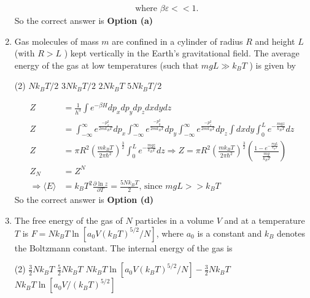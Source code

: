 \begin{enumerate}
\begin{answer}
\begin{align*}
&\text{	where }\beta \varepsilon<<1.
	\end{align*}
		So the correct answer is \textbf{Option (a)}
\end{answer}
\item 	Gas molecules of mass $m$ are confined in a cylinder of radius $R$ and height $L$ (with $R>L$ ) kept vertically in the Earth's gravitational field. The average energy of the gas at low temperatures (such that $m g L \gg k_{B} T$ ) is given by
{	}
	 \begin{tasks}(2)
		\task[\textbf{a.}]$N k_{B} T / 2$
		\task[\textbf{b.}]$3 N k_{B} T / 2$
		\task[\textbf{c.}]$2 N k_{B} T$
		\task[\textbf{d.}] $5 N k_{B} T / 2$
	\end{tasks}
\begin{answer}
	\begin{align*}
	Z&=\frac{1}{h^{3}} \int e^{-\beta H} d p_{x} d p_{y} d p_{z} d x d y d z\\
	Z&=\int_{-\infty}^{\infty} e^{\frac{-p_{x}^{2}}{2 m k_{B} T}} d p_{x} \int_{-\infty}^{\infty} e^{\frac{-p_{y}^{2}}{2 m k_{B} T}} d p_{y} \int_{-\infty}^{\infty} e^{\frac{-p_{z}^{2}}{2 m k_{B} T}} d p_{z} \int d x d y \int_{0}^{L} e^{-\frac{m g z}{k_{B} T}} d z\\
	Z&=\pi R^{2}\left(\frac{m k_{B} T}{2 \pi \hbar^{2}}\right)^{\frac{3}{2}} \int_{0}^{L} e^{-\frac{m g z}{k_{B} T}} d z \Rightarrow Z=\pi R^{2}\left(\frac{m k_{B} T}{2 \pi \hbar^{2}}\right)^{\frac{3}{2}}\left(\frac{1-e^{-\frac{m g L}{k_{B} T}}}{\frac{m g}{k_{B} T}}\right)\\
	Z_{N}&=Z^{N}\\
	\Rightarrow\langle E\rangle&=k_{B} T^{2} \frac{\partial \ln z}{\partial T}=\frac{5 N k_{B} T}{2} \text {, since } m g L>>k_{B} T
	\end{align*}
			So the correct answer is \textbf{Option (d)}
\end{answer}
\item 	The free energy of the gas of $N$ particles in a volume $V$ and at a temperature $T$ is $F=N k_{B} T \ln \left[a_{0} V\left(k_{B} T\right)^{5 / 2} / N\right]$, where $a_{0}$ is a constant and $k_{B}$ denotes the Boltzmann constant. The internal energy of the gas is
{	}
 \begin{tasks}(2)
	\task[\textbf{a.}]$\frac{3}{2} N k_{B} T$
	\task[\textbf{b.}]$\frac{5}{2} N k_{B} T$
	\task[\textbf{c.}]$N k_{B} T \ln \left[a_{0} V\left(k_{B} T\right)^{5 / 2} / N\right]-\frac{3}{2} N k_{B} T$
	\task[\textbf{d.}]  $N k_{B} T \ln \left[a_{0} V /\left(k_{B} T\right)^{5 / 2}\right]$

\end{tasks}
\end{enumerate}
